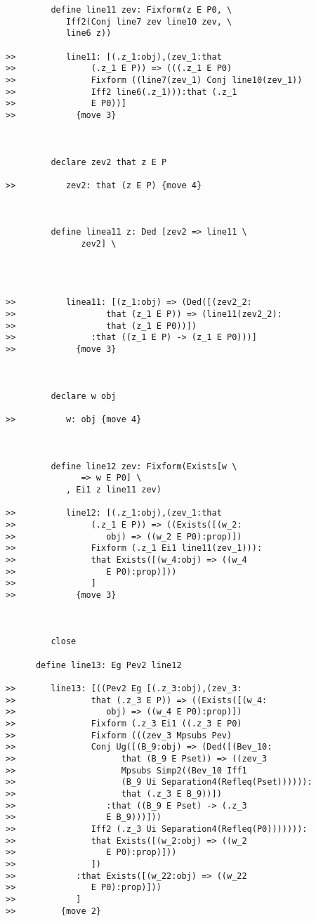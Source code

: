 \documentclass[12pt]{article}
\begin{document}
\begin{verbatim}
         define line11 zev: Fixform(z E P0, \
            Iff2(Conj line7 zev line10 zev, \
            line6 z))

>>          line11: [(.z_1:obj),(zev_1:that
>>               (.z_1 E P)) => (((.z_1 E P0)
>>               Fixform ((line7(zev_1) Conj line10(zev_1))
>>               Iff2 line6(.z_1))):that (.z_1
>>               E P0))]
>>            {move 3}



         declare zev2 that z E P

>>          zev2: that (z E P) {move 4}



         define linea11 z: Ded [zev2 => line11 \
               zev2] \
            



>>          linea11: [(z_1:obj) => (Ded([(zev2_2:
>>                  that (z_1 E P)) => (line11(zev2_2):
>>                  that (z_1 E P0))])
>>               :that ((z_1 E P) -> (z_1 E P0)))]
>>            {move 3}



         declare w obj

>>          w: obj {move 4}



         define line12 zev: Fixform(Exists[w \
               => w E P0] \
            , Ei1 z line11 zev)

>>          line12: [(.z_1:obj),(zev_1:that
>>               (.z_1 E P)) => ((Exists([(w_2:
>>                  obj) => ((w_2 E P0):prop)])
>>               Fixform (.z_1 Ei1 line11(zev_1))):
>>               that Exists([(w_4:obj) => ((w_4
>>                  E P0):prop)]))
>>               ]
>>            {move 3}



         close

      define line13: Eg Pev2 line12

>>       line13: [((Pev2 Eg [(.z_3:obj),(zev_3:
>>               that (.z_3 E P)) => ((Exists([(w_4:
>>                  obj) => ((w_4 E P0):prop)])
>>               Fixform (.z_3 Ei1 ((.z_3 E P0)
>>               Fixform (((zev_3 Mpsubs Pev)
>>               Conj Ug([(B_9:obj) => (Ded([(Bev_10:
>>                     that (B_9 E Pset)) => ((zev_3
>>                     Mpsubs Simp2((Bev_10 Iff1
>>                     (B_9 Ui Separation4(Refleq(Pset)))))):
>>                     that (.z_3 E B_9))])
>>                  :that ((B_9 E Pset) -> (.z_3
>>                  E B_9)))]))
>>               Iff2 (.z_3 Ui Separation4(Refleq(P0))))))):
>>               that Exists([(w_2:obj) => ((w_2
>>                  E P0):prop)]))
>>               ])
>>            :that Exists([(w_22:obj) => ((w_22
>>               E P0):prop)]))
>>            ]
>>         {move 2}




\end{verbatim}
\end{document}
